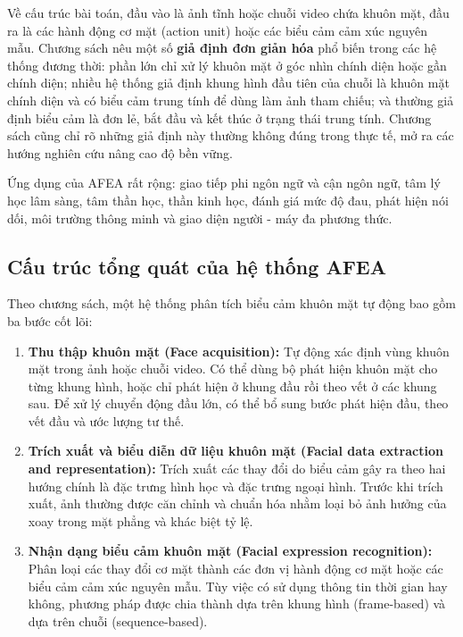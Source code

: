 Về cấu trúc bài toán, đầu vào là ảnh tĩnh hoặc chuỗi video chứa khuôn mặt, đầu ra là các hành động cơ mặt (action unit) hoặc các biểu cảm cảm xúc nguyên mẫu. Chương sách nêu một số \textbf{giả định đơn giản hóa} phổ biến trong các hệ thống đương thời: phần lớn chỉ xử lý khuôn mặt ở góc nhìn chính diện hoặc gần chính diện; nhiều hệ thống giả định khung hình đầu tiên của chuỗi là khuôn mặt chính diện và có biểu cảm trung tính để dùng làm ảnh tham chiếu; và thường giả định biểu cảm là đơn lẻ, bắt đầu và kết thúc ở trạng thái trung tính. Chương sách cũng chỉ rõ những giả định này thường không đúng trong thực tế, mở ra các hướng nghiên cứu nâng cao độ bền vững.

Ứng dụng của AFEA rất rộng: giao tiếp phi ngôn ngữ và cận ngôn ngữ, tâm lý học lâm sàng, tâm thần học, thần kinh học, đánh giá mức độ đau, phát hiện nói dối, môi trường thông minh và giao diện người - máy đa phương thức.

\subsection{Cấu trúc tổng quát của hệ thống AFEA}
Theo chương sách, một hệ thống phân tích biểu cảm khuôn mặt tự động bao gồm ba bước cốt lõi:
\begin{enumerate}
    \item \textbf{Thu thập khuôn mặt (Face acquisition):} Tự động xác định vùng khuôn mặt trong ảnh hoặc chuỗi video. Có thể dùng bộ phát hiện khuôn mặt cho từng khung hình, hoặc chỉ phát hiện ở khung đầu rồi theo vết ở các khung sau. Để xử lý chuyển động đầu lớn, có thể bổ sung bước phát hiện đầu, theo vết đầu và ước lượng tư thế.
    \item \textbf{Trích xuất và biểu diễn dữ liệu khuôn mặt (Facial data extraction and representation):} Trích xuất các thay đổi do biểu cảm gây ra theo hai hướng chính là đặc trưng hình học và đặc trưng ngoại hình. Trước khi trích xuất, ảnh thường được căn chỉnh và chuẩn hóa nhằm loại bỏ ảnh hưởng của xoay trong mặt phẳng và khác biệt tỷ lệ.
    \item \textbf{Nhận dạng biểu cảm khuôn mặt (Facial expression recognition):} Phân loại các thay đổi cơ mặt thành các đơn vị hành động cơ mặt hoặc các biểu cảm cảm xúc nguyên mẫu. Tùy việc có sử dụng thông tin thời gian hay không, phương pháp được chia thành dựa trên khung hình (frame-based) và dựa trên chuỗi (sequence-based).
\end{enumerate}

